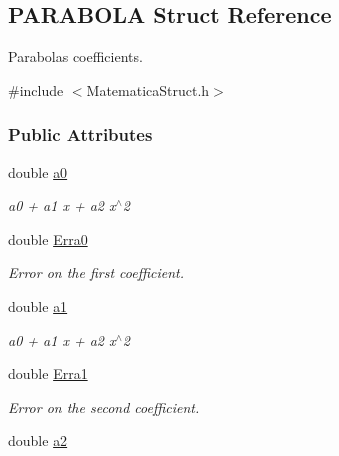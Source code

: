 \hypertarget{structPARABOLA}{}\subsection{P\+A\+R\+A\+B\+O\+LA Struct Reference}
\label{structPARABOLA}


Parabolas coefficients.  




{\ttfamily \#include $<$Matematica\+Struct.\+h$>$}

\subsubsection*{Public Attributes}
\begin{DoxyCompactItemize}
\item 
double \hyperlink{structPARABOLA_ad95dcba445836b4ba94129111a4b888c}{a0}\hypertarget{structPARABOLA_ad95dcba445836b4ba94129111a4b888c}{}\label{structPARABOLA_ad95dcba445836b4ba94129111a4b888c}

\begin{DoxyCompactList}\small\item\em a0 + a1 x + a2 x$^\wedge$2 \end{DoxyCompactList}\item 
double \hyperlink{structPARABOLA_adc871ead9d8fc23f2009f42306b04a5e}{Erra0}\hypertarget{structPARABOLA_adc871ead9d8fc23f2009f42306b04a5e}{}\label{structPARABOLA_adc871ead9d8fc23f2009f42306b04a5e}

\begin{DoxyCompactList}\small\item\em Error on the first coefficient. \end{DoxyCompactList}\item 
double \hyperlink{structPARABOLA_a5d015a3751aec61f2442b957cb6f517a}{a1}\hypertarget{structPARABOLA_a5d015a3751aec61f2442b957cb6f517a}{}\label{structPARABOLA_a5d015a3751aec61f2442b957cb6f517a}

\begin{DoxyCompactList}\small\item\em a0 + a1 x + a2 x$^\wedge$2 \end{DoxyCompactList}\item 
double \hyperlink{structPARABOLA_a9097314f53ed21d9ca0286f35e86d82d}{Erra1}\hypertarget{structPARABOLA_a9097314f53ed21d9ca0286f35e86d82d}{}\label{structPARABOLA_a9097314f53ed21d9ca0286f35e86d82d}

\begin{DoxyCompactList}\small\item\em Error on the second coefficient. \end{DoxyCompactList}\item 
double \hyperlink{structPARABOLA_ac55c2d269ed76bd9bdb7fb25f3533a4e}{a2}\hypertarget{structPARABOLA_ac55c2d269ed76bd9bdb7fb25f3533a4e}{}\label{structPARABOLA_ac55c2d269ed76bd9bdb7fb25f3533a4e}


\end{DoxyCompactItemize}
